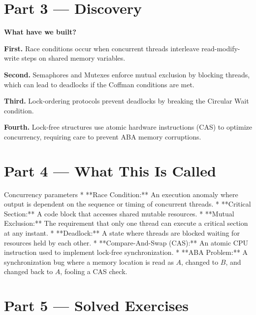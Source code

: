 \documentclass[12pt, a4paper]{book}
\begin{document}
\newpage

\section{Part 3 --- Discovery}

\begin{discoverybox}
\textbf{What have we built?}

\textbf{First.} Race conditions occur when concurrent threads interleave read-modify-write steps on shared memory variables.

\textbf{Second.} Semaphores and Mutexes enforce mutual exclusion by blocking threads, which can lead to deadlocks if the Coffman conditions are met.

\textbf{Third.} Lock-ordering protocols prevent deadlocks by breaking the Circular Wait condition.

\textbf{Fourth.} Lock-free structures use atomic hardware instructions (CAS) to optimize concurrency, requiring care to prevent ABA memory corruptions.
\end{discoverybox}

\newpage

\section{Part 4 --- What This Is Called}

\begin{namedconcept}{Concurrency parameters}
* **Race Condition:** An execution anomaly where output is dependent on the sequence or timing of concurrent threads.
* **Critical Section:** A code block that accesses shared mutable resources.
* **Mutual Exclusion:** The requirement that only one thread can execute a critical section at any instant.
* **Deadlock:** A state where threads are blocked waiting for resources held by each other.
* **Compare-And-Swap (CAS):** An atomic CPU instruction used to implement lock-free synchronization.
* **ABA Problem:** A synchronization bug where a memory location is read as $A$, changed to $B$, and changed back to $A$, fooling a CAS check.
\end{namedconcept}

\newpage

\section{Part 5 --- Solved Exercises}
\end{document}
